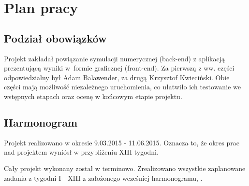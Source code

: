 
\section{Plan pracy}
\subsection{Podział obowiązków}
Projekt zakładał powiązanie symulacji numerycznej (back-end) z aplikacją prezentującą wyniki w~formie graficznej (front-end). Za pierwszą z ww. części odpowiedzialny był Adam
Balawender, za drugą Krzysztof Kwieciński. Obie części mają możliwość niezależnego uruchomienia, co ułatwiło ich testowanie we wstępnych etapach oraz ocenę w końcowym etapie projektu.

\subsection{Harmonogram}
Projekt realizowano w okresie 9.03.2015 - 11.06.2015. Oznacza to, że okres prac nad projektem wyniósł w przybliżeniu XIII tygodni.

Cały projekt wykonany został w terminowo. Zrealizowano wszystkie zaplanowane zadania z tygodni I - XIII z założonego wcześniej harmonogramu, \cite{ABKKWstepne}.  

